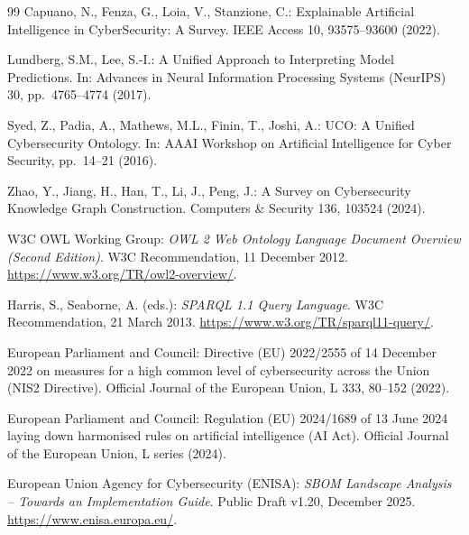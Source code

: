 \documentclass[runningheads]{llncs}
\begin{document}
\begin{thebibliography}{99}
Capuano, N., Fenza, G., Loia, V., Stanzione, C.:
Explainable Artificial Intelligence in CyberSecurity: A Survey.
IEEE Access 10, 93575--93600 (2022).

Lundberg, S.M., Lee, S.-I.:
A Unified Approach to Interpreting Model Predictions.
In: Advances in Neural Information Processing Systems (NeurIPS) 30,
pp.~4765--4774 (2017).

Syed, Z., Padia, A., Mathews, M.L., Finin, T., Joshi, A.:
UCO: A Unified Cybersecurity Ontology.
In: AAAI Workshop on Artificial Intelligence for Cyber Security,
pp.~14--21 (2016).

Zhao, Y., Jiang, H., Han, T., Li, J., Peng, J.:
A Survey on Cybersecurity Knowledge Graph Construction.
Computers \& Security 136, 103524 (2024).

W3C OWL Working Group:
\emph{OWL 2 Web Ontology Language Document Overview (Second Edition)}.
W3C Recommendation, 11 December 2012.
\url{https://www.w3.org/TR/owl2-overview/}.

Harris, S., Seaborne, A. (eds.):
\emph{SPARQL 1.1 Query Language}.
W3C Recommendation, 21 March 2013.
\url{https://www.w3.org/TR/sparql11-query/}.

European Parliament and Council:
Directive (EU) 2022/2555 of 14 December 2022 on measures for a high
common level of cybersecurity across the Union (NIS2 Directive).
Official Journal of the European Union, L 333, 80--152 (2022).

European Parliament and Council:
Regulation (EU) 2024/1689 of 13 June 2024 laying down harmonised
rules on artificial intelligence (AI Act).
Official Journal of the European Union, L series (2024).

European Union Agency for Cybersecurity (ENISA):
\emph{SBOM Landscape Analysis -- Towards an Implementation Guide}.
Public Draft v1.20, December 2025.
\url{https://www.enisa.europa.eu/}.

\end{thebibliography}
\end{document}
